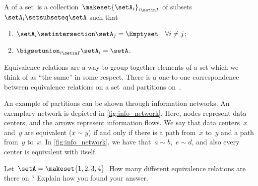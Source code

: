 \begin{ctdefinition}[Partition]
    \label{def:partition}
    A \emph{} of a set~\setA is a collection~$\makeset{\setA_i}_{i\setin I}$ of subsets~$\setA_i\setsubseteq \setA$ such that
    \begin{enumerate}
        \item $\setA_i\setintersection \setA_j=\Emptyset \quad \forall i\neq j$;
        \item $\bigsetunion_{i\setin I}\setA_i=\setA$.
    \end{enumerate}
\end{ctdefinition}

\begin{remark}
    Equivalence relations are a way to group together elements of a set which we think of as ``the same'' in some respect.
    There is a one-to-one correspondence between equivalence relations on a set~\setA and partitions on~\setA.
\end{remark}

\begin{marginfigure}
    \centering
    \caption{
        \label{fig:info_network}
    }
\end{marginfigure}

\begin{example}
    An example of partitions can be shown through information networks.
    An exemplary network is depicted in \cref{fig:info_network}.
    Here, nodes represent data centers, and the arrows represent information flows.
    We say that data centers~$x$ and~$y$ are equivalent ($x\sim y$) if and only if there is a path from~$x$ to~$y$ and a path from~$y$ to~$x$.
    In \cref{fig:info_network}, we have that~$a\sim b$,~$e\sim d$, and also every center is equivalent with itself.
\end{example}

\vfill
\begin{gradedexercise}
    \label{ex:CountingEquivalenceRelations}
    Let~$\setA = \makeset{ 1, 2, 3, 4 }$.
    How many different equivalence relations are there on \setA?
    Explain how you found your answer.
\end{gradedexercise}

